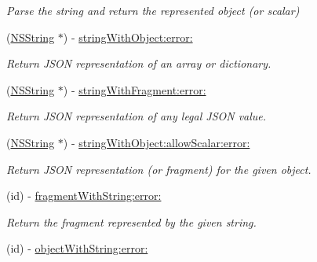 \begin{DoxyCompactItemize}
\begin{DoxyCompactList}\small\item\em \-Parse the string and return the represented object (or scalar) \end{DoxyCompactList}\item 
\hypertarget{interface_s_b_j_s_o_n_a3687db463abee044cb06e0924142deb8}{
(\hyperlink{class_n_s_string}{\-N\-S\-String} $\ast$) -\/ \hyperlink{interface_s_b_j_s_o_n_a3687db463abee044cb06e0924142deb8}{string\-With\-Object\-:error\-:}}
\label{interface_s_b_j_s_o_n_a3687db463abee044cb06e0924142deb8}

\begin{DoxyCompactList}\small\item\em \-Return \-J\-S\-O\-N representation of an array or dictionary. \end{DoxyCompactList}\item 
\hypertarget{interface_s_b_j_s_o_n_a006d605894edce824a18ec157ec28a3e}{
(\hyperlink{class_n_s_string}{\-N\-S\-String} $\ast$) -\/ \hyperlink{interface_s_b_j_s_o_n_a006d605894edce824a18ec157ec28a3e}{string\-With\-Fragment\-:error\-:}}
\label{interface_s_b_j_s_o_n_a006d605894edce824a18ec157ec28a3e}

\begin{DoxyCompactList}\small\item\em \-Return \-J\-S\-O\-N representation of any legal \-J\-S\-O\-N value. \end{DoxyCompactList}\item 
\hypertarget{interface_s_b_j_s_o_n_a1daa6e2cb4bac21afe6c884ece6dc4ad}{
(\hyperlink{class_n_s_string}{\-N\-S\-String} $\ast$) -\/ \hyperlink{interface_s_b_j_s_o_n_a1daa6e2cb4bac21afe6c884ece6dc4ad}{string\-With\-Object\-:allow\-Scalar\-:error\-:}}
\label{interface_s_b_j_s_o_n_a1daa6e2cb4bac21afe6c884ece6dc4ad}

\begin{DoxyCompactList}\small\item\em \-Return \-J\-S\-O\-N representation (or fragment) for the given object. \end{DoxyCompactList}\item 
\hypertarget{interface_s_b_j_s_o_n_aa88f7cb9ddc4ab7fd6e9fc0853e6da6a}{
(id) -\/ \hyperlink{interface_s_b_j_s_o_n_aa88f7cb9ddc4ab7fd6e9fc0853e6da6a}{fragment\-With\-String\-:error\-:}}
\label{interface_s_b_j_s_o_n_aa88f7cb9ddc4ab7fd6e9fc0853e6da6a}

\begin{DoxyCompactList}\small\item\em \-Return the fragment represented by the given string. \end{DoxyCompactList}\item 
\hypertarget{interface_s_b_j_s_o_n_a2b0ae389a765270663c1e1110bcef613}{
(id) -\/ \hyperlink{interface_s_b_j_s_o_n_a2b0ae389a765270663c1e1110bcef613}{object\-With\-String\-:error\-:}}
\label{interface_s_b_j_s_o_n_a2b0ae389a765270663c1e1110bcef613}


\end{DoxyCompactItemize}
